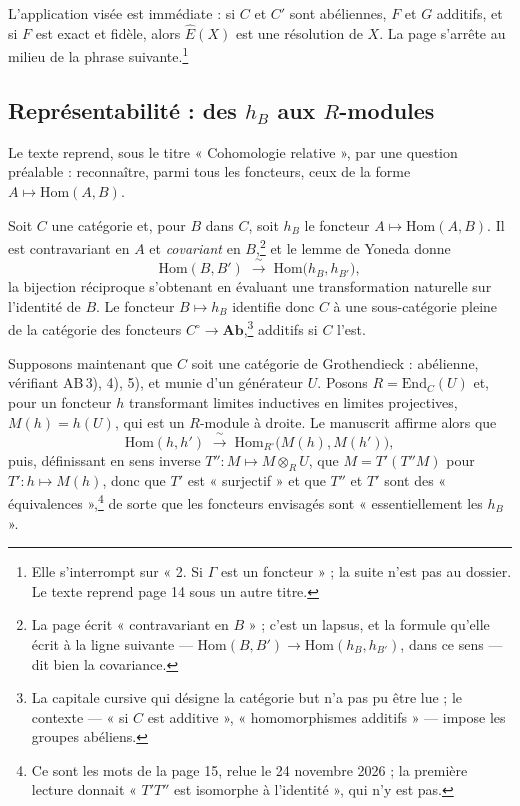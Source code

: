 \documentclass[11pt,a4paper]{article}
\begin{document}
L'application visée est immédiate : si $C$ et $C'$ sont abéliennes, $F$ et $G$
additifs, et si $F$ est exact et fidèle, alors $\widehat{E}(X)$ est une
résolution de $X$. La page s'arrête au milieu de la phrase
suivante.\footnote{Elle s'interrompt sur « 2. Si $\Gamma$ est un foncteur » ;
la suite n'est pas au dossier. Le texte reprend page 14 sous un autre titre.}

\subsection*{Représentabilité : des $h_{B}$ aux $R$-modules}

Le texte reprend, sous le titre « Cohomologie relative », par une question
préalable : reconnaître, parmi tous les foncteurs, ceux de la forme
$A \mapsto \mathrm{Hom}(A, B)$.

Soit $C$ une catégorie et, pour $B$ dans $C$, soit $h_{B}$ le foncteur
$A \mapsto \mathrm{Hom}(A, B)$. Il est contravariant en $A$ et \emph{covariant}
en $B$,\footnote{La page écrit « contravariant en $B$ » ; c'est un lapsus, et
la formule qu'elle écrit à la ligne suivante — $\mathrm{Hom}(B,B') \to
\mathrm{Hom}(h_{B}, h_{B'})$, dans ce sens — dit bien la covariance.} et le
lemme de Yoneda donne
\[
  \mathrm{Hom}(B, B') \;\xrightarrow{\ \sim\ }\;
  \mathrm{Hom}\bigl( h_{B}, h_{B'} \bigr) ,
\]
la bijection réciproque s'obtenant en évaluant une transformation naturelle sur
l'identité de $B$. Le foncteur $B \mapsto h_{B}$ identifie donc $C$ à une
sous-catégorie pleine de la catégorie des foncteurs $C^{\circ} \to
\mathbf{Ab}$,\footnote{La capitale cursive qui désigne la catégorie but n'a pas
pu être lue ; le contexte — « si $C$ est additive », « homomorphismes
additifs » — impose les groupes abéliens.} additifs si $C$ l'est.

Supposons maintenant que $C$ soit une catégorie de Grothendieck : abélienne,
vérifiant AB\,3), 4), 5), et munie d'un générateur $U$. Posons
$R = \mathrm{End}_{C}(U)$ et, pour un foncteur $h$ transformant limites
inductives en limites projectives, $M(h) = h(U)$, qui est un $R$-module à
droite. Le manuscrit affirme alors que
\[
  \mathrm{Hom}(h, h') \;\xrightarrow{\ \sim\ }\;
  \mathrm{Hom}_{R^{\circ}}\bigl( M(h), M(h') \bigr) ,
\]
puis, définissant en sens inverse $T'' : M \mapsto M \otimes_{R} U$, que
$M = T'(T''M)$ pour $T' : h \mapsto M(h)$, donc que $T'$ est « surjectif » et
que $T''$ et $T'$ sont des « équivalences »,\footnote{Ce sont les mots de la
page 15, relue le 24 novembre 2026 ; la première lecture donnait « $T'T''$ est
isomorphe à l'identité », qui n'y est pas.} de sorte que les foncteurs envisagés sont
« essentiellement les $h_{B}$ ».
\end{document}
